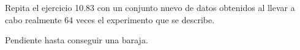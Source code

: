 \begin{enunciado}
 Repita el ejercicio 10.83 con un conjunto nuevo de datos obtenidos
 al llevar a cabo realmente $64$ veces el experimento que se describe.
\end{enunciado}

\begin{solucion}
 Pendiente hasta conseguir una baraja.
\end{solucion}
